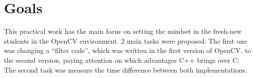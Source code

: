 \section{Goals}\label{sec:1}
This practical work has the main focus on setting the mindset in the fresh-new students in the OpenCV environment. 2 main tasks were proposed: The first one was changing a ``filter code'', which was written in the first version of OpenCV, to the second version, paying attention on which advantages C++ brings over C; The second task was measure the time difference between both implementations.    